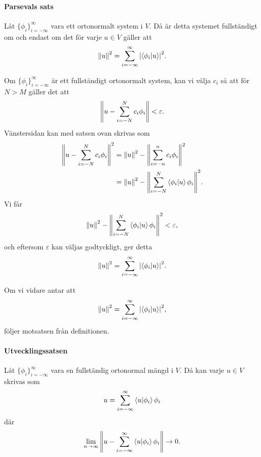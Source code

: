 \paragraph{Parsevals sats}
Låt $\{\phi_{i}\}_{i = -\infty}^{\infty}$ vara ett ortonormalt system i $V$. Då är detta systemet fullständigt om och endast om det för varje $u\in V$ gäller att
\begin{align*}
	\norm{u}^{2} = \sum\limits_{i = -\infty}^{\infty}\abs{\bra{\phi_{i}}\ket{u}}^{2}.
\end{align*}

\proof
Om $\{\phi_{i}\}_{i = -\infty}^{\infty}$ är ett fullständigt ortonormalt system, kan vi välja $c_{i}$ så att för $N > M$ gäller det att
\begin{align*}
	\norm{u - \sum\limits_{i = -N}^{N}c_{i}\phi_{i}} < \varepsilon.
\end{align*}
Vänstersidan kan med satsen ovan skrivas som
\begin{align*}
	\norm{u - \sum\limits_{i = -N}^{N}c_{i}\phi_{i}}^{2} &= \norm{u}^{2} - \norm{\sum\limits_{i = -n}^{n}c_{i}\phi_{i}}^{2} \\
	                                                    &= \norm{u}^{2} - \norm{\sum\limits_{i = -N}^{N}\bra{\phi_{i}}\ket{u}\phi_{i}}^{2}.
\end{align*}
Vi får
\begin{align*}
	\norm{u}^{2} - \norm{\sum\limits_{i = -N}^{N}\bra{\phi_{i}}\ket{u}\phi_{i}}^{2} < \varepsilon,
\end{align*}
och eftersom $\varepsilon$ kan väljas godtyckligt, ger detta
\begin{align*}
	\norm{u}^{2} = \sum\limits_{i = -\infty}^{\infty}\abs{\bra{\phi_{i}}\ket{u}}^{2}.
\end{align*}

Om vi vidare antar att
\begin{align*}
	\norm{u}^{2} = \sum\limits_{i = -\infty}^{\infty}\abs{\bra{\phi_{i}}\ket{u}}^{2},
\end{align*}
följer motsatsen från definitionen.

\paragraph{Utvecklingssatsen}
Låt $\{\phi_{i}\}_{i = -\infty}^{\infty}$ vara en fullständig ortonormal mängd i $V$. Då kan varje $u\in V$ skrivas som
\begin{align*}
	u = \sum\limits_{i = -\infty}^{\infty}\bra{u}\ket{\phi_{i}}\phi_{i}
\end{align*}
där
\begin{align*}
	\lim\limits_{n\to\infty}\norm{u - \sum\limits_{i = -\infty}^{\infty}\bra{u}\ket{\phi_{i}}\phi_{i}}\to 0.
\end{align*}

